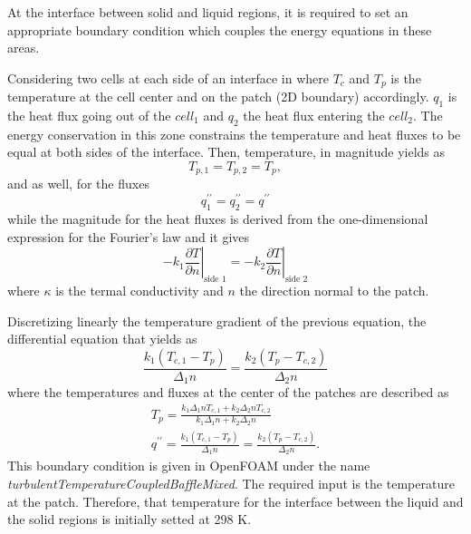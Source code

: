 \noindent At the interface between solid and liquid regions, it is required to set an appropriate boundary condition which couples the energy equations in these areas.

\noindent Considering two cells at each side of an interface in where $T_c$ and $T_p$ is the temperature at the cell center and on the patch (2D boundary) accordingly. $q_1$ is the heat flux going out of the $cell_1$ and $q_2$ the heat flux entering the $cell_2$. The energy conservation in this zone constrains the temperature and heat fluxes to be equal at both sides of the interface. 
Then, temperature, in magnitude yields as
\begin{equation}
	T_{p, 1}=T_{p, 2}=T_{p},
	\label{4.9}
\end{equation}
and as well, for the fluxes
\begin{equation}
	q_{1}^{\prime \prime}=q_{2}^{\prime \prime}=q^{\prime \prime}
	\label{4.10}
\end{equation}
while the magnitude for the heat fluxes is derived from the one-dimensional expression for the Fourier's law and it gives
\begin{equation}
	-\left.k_{1} \frac{\partial T}{\partial n}\right|_{\text {side } 1}=-\left.k_{2} \frac{\partial T}{\partial n}\right|_{\text {side } 2}
	\label{4.11}
\end{equation}
where $\kappa$ is the termal conductivity and $n$ the direction normal to the patch.

\noindent Discretizing linearly the temperature gradient of the previous equation, the differential equation that yields as
\begin{equation}
	\frac{k_{1}\left(T_{c, 1}-T_{p}\right)}{\Delta_{1}n} = \frac{k_{2}\left(T_{p}-T_{c, 2}\right)}{\Delta_{2}n} 
	\label{4.12}
\end{equation}
where the temperatures and fluxes at the center of the patches are described as
\begin{equation}
	\begin{gathered}
	T_{p}=\frac{k_{1} \Delta_{1}n T_{c, 1}+k_{2} \Delta_{2}n T_{c, 2}}{k_{1} \Delta_{1}n+k_{2} \Delta_{2}n} \\
	q^{\prime \prime}=\frac{k_{1}\left(T_{c, 1}-T_{p}\right)}{\Delta_{1}n} =\frac{k_{2}\left(T_{p}-T_{c, 2}\right)}{ \Delta_{2}n} .
	\end{gathered}
	\label{4.13}
\end{equation}
This boundary condition is given in OpenFOAM under the name \textit{turbulentTemperatureCoupledBaffleMixed}. The required input is the temperature at the patch. Therefore, that temperature for the interface between the liquid and the solid regions is initially setted at 298 K.

